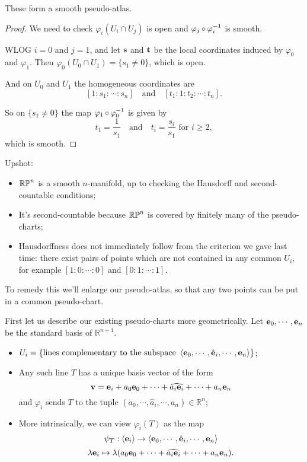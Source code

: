 \documentclass[a4paper,11pt]{article}
\begin{document}
	\begin{lem}
		These form a smooth pseudo-atlas.
	\end{lem}
	\begin{proof}
		We need to check $\varphi_i ( U_i \cap U_j)$ is open and $\varphi_j \operatorname{\circ} \varphi_i ^{-1}$ is smooth.

		WLOG $i = 0$ and $j = 1$, and let $\vb s$ and $\vb t$ be the local coordinates induced by $\varphi_0$ and $\varphi_1$. Then $\varphi_0 (U_0 \cap U_1) = \{s_1 \neq 0\}$, which is open.

		And on $U_0$ and $U_1$ the homogeneous coordinates are
		\[
			[1 : s_1 : \cdots : s_n] \quad \text{and} \quad [t_1 : 1 : t_2 : \cdots : t_n].
		\]
		
		So on $\{s_1 \neq 0\}$ the map $\varphi_1 \operatorname{\circ} \varphi_0^{-1}$ is given by
		\[
			t_1 = \frac{1}{s_1} \quad \text{and} \quad t_i = \frac{s_i}{s_1} \text{ for } i \geq 2,
		\]
		which is smooth.
	\end{proof}

	Upshot:
	\begin{itemize}
		\item $\mathbb{RP}^{n}$ is a smooth $n$-manifold, up to checking the Hausdorff and second-countable conditions;
		\item It's second-countable because $\mathbb{RP}^{n}$ is covered by finitely many of the pseudo-charts;
		\item Hausdorffness does not immediately follow from the criterion we gave last time: there exist pairs of points which are not contained in any common $U_i$, for example $[1:0: \cdots : 0]$ and $[0: 1 : \cdots : 1]$.
	\end{itemize}

	To remedy this we'll enlarge our pseudo-atlas, so that any two points can be put in a common pseudo-chart.

	First let us describe our existing pseudo-charts more geometrically. Let $\vb e_0, \cdots, \vb e_n$ be the standard basis of $\mathbb{R}^{n+1}$.

	\begin{itemize}
		\item $U_i = \{\text{lines complementary to the subspace }\expval{\vb e_0, \cdots, \hat{\vb e}_i, \cdots, \vb e_n}\}$;
		\item Any such line $T$ has a unique basis vector of the form \[
			\vb v = \vb e_i + a_0 \vb e_0 + \cdots + \widehat{a_i \vb e_i} + \cdots + a_n \vb e_n
		\]
		and $\varphi_i$ sends $T$ to the tuple $(a_0, \cdots, \hat{a}_i, \cdots , a_n) \in \mathbb{R}^n$;
		\item More intrinsically, we can view $\varphi_i (T)$ as the map \[
			\psi_T : \expval{\vb e_i} \to \expval{\vb e_0 , \cdots , \hat{\vb e}_i, \cdots, \vb e_n}
		\]
		\[
			\lambda \vb e_i \mapsto \lambda (a_0 \vb e_0 + \cdots + \widehat{a_i \vb e_i} + \cdots + a_n \vb e_n).
		\]
	\end{itemize}
\end{document}
